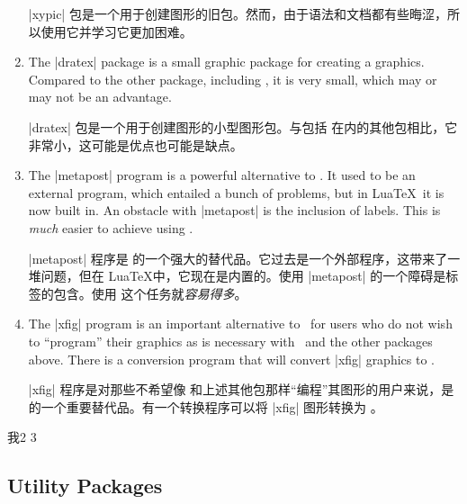 \begin{enumerate}
        |xypic| 包是一个用于创建图形的旧包。然而，由于语法和文档都有些晦涩，所以使用它并学习它更加困难。
    \item The |dratex| package is a small graphic package for creating a
        graphics. Compared to the other package, including \tikzname, it is
        very small, which may or may not be an advantage.

        |dratex| 包是一个用于创建图形的小型图形包。与包括 \tikzname 在内的其他包相比，它非常小，这可能是优点也可能是缺点。
    \item The |metapost| program is a powerful alternative to \tikzname. It
        used to be an external program, which entailed a bunch of problems,
        but in Lua\TeX\ it is now built in. An obstacle with |metapost| is
        the inclusion of labels. This is \emph{much} easier to achieve using
        \pgfname.

        |metapost| 程序是 \tikzname 的一个强大的替代品。它过去是一个外部程序，这带来了一堆问题，但在 Lua\TeX 中，它现在是内置的。使用 |metapost| 的一个障碍是标签的包含。使用 \pgfname 这个任务就\emph{容易得多}。
    \item The |xfig| program is an important alternative to \tikzname\ for
        users who do not wish to ``program'' their graphics as is necessary
        with \tikzname\ and the other packages above. There is a conversion
        program that will convert |xfig| graphics to \tikzname.

        |xfig| 程序是对那些不希望像 \tikzname 和上述其他包那样“编程”其图形的用户来说，是 \tikzname 的一个重要替代品。有一个转换程序可以将 |xfig| 图形转换为 \tikzname。
\end{enumerate}



我2 3


\subsection{Utility Packages}

